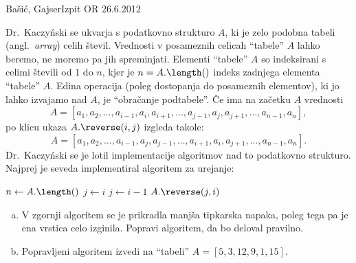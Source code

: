 \begin{naloga}{Bašić, Gajser}{Izpit OR 26.6.2012}
\begin{vprasanje}
Dr.~Kaczyński se ukvarja s podatkovno strukturo $A$,
ki je zelo podobna tabeli (angl.~{\em array}) celih števil.
Vrednosti v posameznih celicah ``tabele'' $A$ lahko beremo,
ne moremo pa jih spreminjati.
Elementi ``tabele'' $A$ so indeksirani s celimi števili od $1$ do $n$,
kjer je $n = A.\length()$ indeks zadnjega elementa ``tabele'' $A$.
Edina operacija (poleg dostopanja do posameznih elementov),
ki jo lahko izvajamo nad $A$, je ``obračanje podtabele''.
Če ima na začetku $A$ vrednosti
$$
A = [a_1, a_2, \dots, a_{i-1}, a_i, a_{i+1}, \dots, a_{j-1}, a_j, a_{j+1},
     \dots, a_{n-1}, a_n],
$$
po klicu ukaza $A.\reverse(i, j)$ izgleda takole:
$$
A = [a_1, a_2, \dots, a_{i-1}, a_j, a_{j-1}, \dots, a_{i+1}, a_i, a_{j+1},
     \dots, a_{n-1}, a_n] .
$$
Dr.~Kaczyński se je lotil implementacije algoritmov
nad to podatkovno strukturo.
Najprej je seveda implementiral algoritem za urejanje:
\begin{small}
\begin{algorithmic}
\State $n \gets A.\length()$
    \State $j \gets i$
        \State $j \gets i-1$
    \EndWhile
    \State $A.\reverse(j, i)$
        \State
    \EndIf
\EndFor
\end{algorithmic}
\end{small}

\begin{enumerate}[(a)]
\item V zgornji algoritem se je prikradla manjša tipkarska napaka,
poleg tega pa je ena vrstica celo izginila.
Popravi algoritem, da bo deloval pravilno.

\item Popravljeni algoritem izvedi na ``tabeli'' $A = [5, 3, 12, 9, 1, 15]$.
\end{enumerate}
\end{vprasanje}
\begin{odgovor}
\end{odgovor}
\end{naloga}
